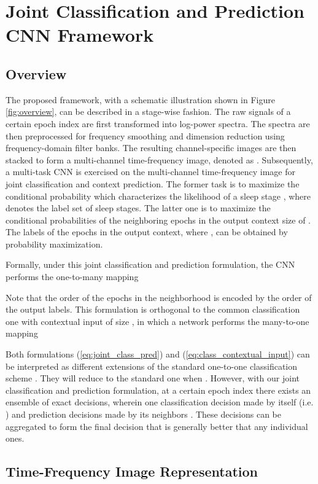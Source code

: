 \documentclass[10pt,twocolumn,twoside]{IEEEtran}
\begin{document}
\section{Joint Classification and Prediction CNN Framework}
\label{sec:framework}
\subsection{Overview}
\label{ssec:overview}
The proposed framework, with a schematic illustration shown in Figure \ref{fig:overview}, can be described in a stage-wise fashion. The raw signals of a certain epoch index  are first transformed into log-power spectra. The spectra are then preprocessed for frequency smoothing and dimension reduction using frequency-domain filter banks. The resulting channel-specific images are then stacked to form a multi-channel time-frequency image, denoted as . Subsequently, a multi-task CNN is exercised on the multi-channel time-frequency image for joint classification and context prediction. 
The former task is to maximize the conditional probability  which characterizes the likelihood of a sleep stage , where  denotes the label set of  sleep stages.
The latter one is to maximize the conditional probabilities   of the neighboring epochs in the output context size of . 
The labels of the epochs in the output context, where , can be obtained by probability maximization.

Formally, under this joint classification and prediction formulation, the CNN performs the one-to-many mapping 

Note that the order of the epochs in the neighborhood is encoded by the order of the output labels. This formulation is orthogonal to the common classification one with contextual input of size , in which a network performs the many-to-one mapping


Both formulations (\ref{eq:joint_class_pred}) and (\ref{eq:class_contextual_input}) can be interpreted as different extensions of the standard one-to-one classification scheme \cite{Phan2018c, Phan2018d, Andreotti2018}. They will reduce to the standard one when . However, with our joint classification and prediction formulation, at a certain epoch index  there exists an ensemble of exact  decisions, wherein one classification decision made by itself (i.e. ) and  prediction decisions made by its neighbors . These decisions can be aggregated to form the final decision that is generally better that any individual ones. 

\subsection{Time-Frequency Image Representation}
\label{ssec:representation}
\end{document}
